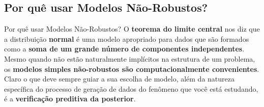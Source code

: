 \subsection{Por quê usar Modelos Não-Robustos?}
\begin{frame}{Por quê usar Modelos Não-Robustos?}
	O \textbf{teorema do limite central} nos diz que a distribuição \textbf{normal}
	é uma modelo apropriado para dados que são formados como a \textbf{soma de um grande número
		de componentes independentes}.
	\vfill
	Mesmo quando não estão naturalmente implícitos na estrutura de um problema,
	os \textbf{modelos simples não-robustos são computacionalmente convenientes}.
	\vfill
	Claro o que deve sempre guiar a sua escolha de modelo, além da natureza específica
	do processo de geração de dados do fenômeno que você está estudando, é
	a \textbf{verificação preditiva da posterior}.
\end{frame}
